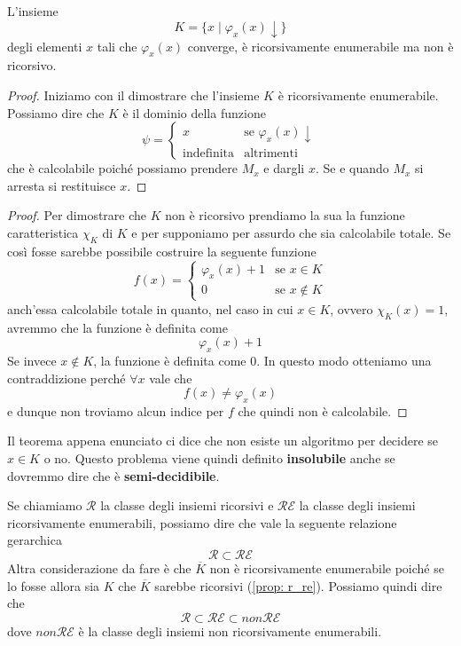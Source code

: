 \begin{theorem}
	L'insieme
	\[ K = \{ x \mid \varphi_x(x) \downarrow \} \]
	degli elementi $x$ tali che $\varphi_x (x)$ converge, è
	ricorsivamente enumerabile ma non è ricorsivo.
	\begin{proof}
		Iniziamo con il dimostrare che l'insieme $K$ è
		ricorsivamente enumerabile. Possiamo dire che $K$ è il
		dominio della funzione
		\[
			\psi = \begin{cases}
				x                 & \text{se } \varphi_x(x) \downarrow \\
				\text{indefinita} & \text{altrimenti}
			\end{cases}
		\]
		che è calcolabile poiché possiamo prendere $M_x$ e
		dargli $x$. Se e quando $M_x$ si arresta si restituisce
		$x$.
	\end{proof}
	\begin{proof}
		Per dimostrare che $K$ non è ricorsivo prendiamo la sua
		la funzione caratteristica $\chi_K$ di $K$ e per
		supponiamo per assurdo che sia calcolabile totale. Se
		così fosse sarebbe possibile costruire la seguente
		funzione
		\[
			f(x) = \begin{cases}
				\varphi_x (x) + 1 & \text{se } x \in K    \\
				0                 & \text{se } x \notin K
			\end{cases}
		\]
		anch'essa calcolabile totale in quanto, nel caso in cui
		$x \in K$, ovvero $\chi_K(x) = 1$, avremmo che la
		funzione è definita come
		\[ \varphi_x (x) + 1 \]
		Se invece $x \notin K$, la funzione è definita come $0$.
		In questo modo otteniamo una contraddizione perché
		$\forall x$ vale che
		\[ f(x) \neq \varphi_x (x) \]
		e dunque non troviamo alcun indice per $f$ che quindi
		non è calcolabile.
	\end{proof}
\end{theorem}

Il teorema appena enunciato ci dice che non esiste un algoritmo
per decidere se $x \in K$ o no. Questo problema viene quindi
definito \textbf{insolubile} anche se dovremmo dire che è
\textbf{semi-decidibile}.

Se chiamiamo $\mathcal{R}$ la classe degli insiemi ricorsivi e
$\mathcal{RE}$ la classe degli insiemi ricorsivamente
enumerabili, possiamo dire che vale la seguente relazione
gerarchica
\[ \mathcal{R} \subset	\mathcal{RE} \]
Altra considerazione da fare è che $\overline{K}$ non è
ricorsivamente enumerabile poiché se lo fosse allora sia $K$
che $\overline{K}$ sarebbe ricorsivi (\ref{prop: r_re}).
Possiamo quindi dire che
\[ \mathcal{R} \subset \mathcal{RE} \subset non\mathcal{RE} \]
dove $non \mathcal{RE}$ è la classe degli insiemi non
ricorsivamente enumerabili.

